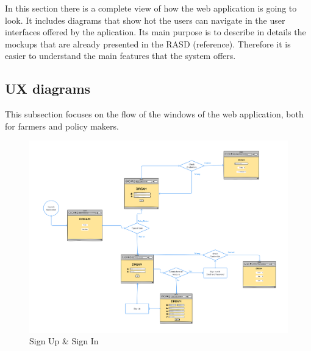 In this section there is a complete view of how the web application is going to look. 
It includes diagrams that show hot the users can navigate in the user interfaces offered by the aplication.
Its main purpose is to describe in details the mockups that are already presented in the RASD (reference). Therefore it is easier to understand 
the main features that the system offers.


\subsection{UX diagrams}
This subsection focuses on the flow of the windows of the web application, 
both for farmers and policy makers.

\begin{figure}[H]
    \begin{center}
          \includegraphics[width=1\textwidth]{images/UXdiagram_login.png}
          \caption{Sign Up \& Sign In}
    \end{center}
\end{figure}

